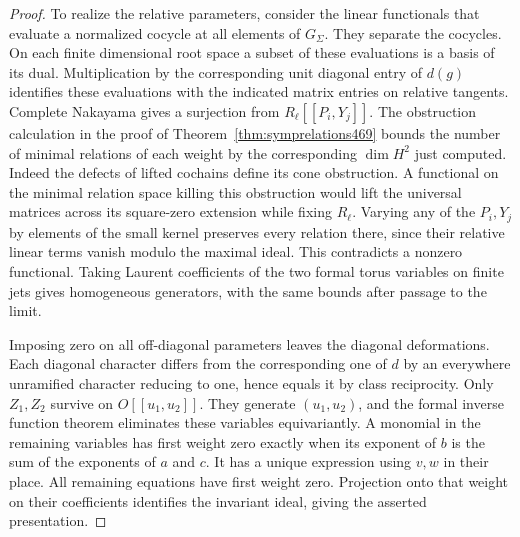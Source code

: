 \documentclass[a4paper,11pt]{article}
\theoremstyle{definition}
\theoremstyle{remark}
\numberwithin{equation}{section}
\begin{document}
\begin{proof}
To realize the relative parameters, consider the linear
functionals that evaluate a normalized cocycle at all elements
of \(G_\Sigma\). They separate the cocycles. On each finite
dimensional root space a subset of these evaluations is a basis
of its dual. Multiplication by the corresponding unit diagonal
entry of \(d(g)\) identifies these evaluations with the indicated
matrix entries on relative tangents. Complete Nakayama gives a
surjection from \(R_\ell[[P_i,Y_j]]\). The obstruction calculation
in the proof of Theorem~\ref{thm:symprelations469} bounds the
number of minimal relations of each weight by the corresponding
\(\dim H^2\) just computed. Indeed the defects of lifted cochains
define its cone obstruction. A functional on the minimal relation
space killing this obstruction would lift the universal matrices
across its square-zero extension while fixing \(R_\ell\). Varying
any of the \(P_i,Y_j\) by elements of the small kernel preserves
every relation there, since their relative linear terms vanish
modulo the maximal ideal. This contradicts a nonzero functional.
Taking Laurent coefficients of the two formal torus variables on
finite jets gives homogeneous generators, with the same bounds
after passage to the limit.

Imposing zero on all off-diagonal parameters leaves the diagonal
deformations. Each diagonal character differs from the corresponding
one of \(d\) by an everywhere unramified character reducing to
one, hence equals it by class reciprocity. Only \(Z_1,Z_2\) survive
on \(O[[u_1,u_2]]\). They generate \((u_1,u_2)\), and the formal
inverse function theorem eliminates these variables equivariantly.
A monomial in the remaining variables has first weight zero
exactly when its exponent of \(b\) is the sum of the exponents
of \(a\) and \(c\). It has a unique expression using \(v,w\)
in their place. All remaining equations have first weight zero.
Projection onto that weight on their coefficients identifies the
invariant ideal, giving the asserted presentation.
\end{proof}
\end{document}
